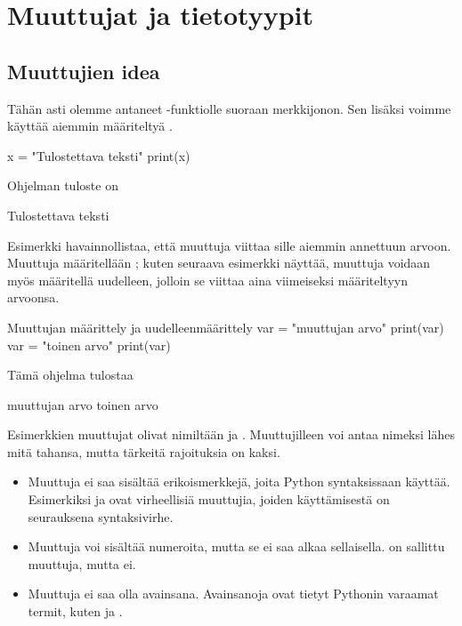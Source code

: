 \chapter{Muuttujat ja tietotyypit}

\section{Muuttujien idea}

Tähän asti olemme antaneet -funktiolle suoraan merkkijonon. Sen lisäksi voimme käyttää aiemmin määriteltyä .

\begin{python}
x = "Tulostettava teksti"
print(x)
\end{python}

Ohjelman tuloste on

\begin{output}
Tulostettava teksti
\end{output}

Esimerkki havainnollistaa, että muuttuja viittaa sille aiemmin annettuun arvoon. Muuttuja määritellään ; kuten seuraava esimerkki näyttää, muuttuja voidaan myös määritellä uudelleen, jolloin se viittaa aina viimeiseksi määriteltyyn arvoonsa.

\begin{example}{Muuttujan määrittely ja uudelleenmäärittely}
var = "muuttujan arvo"
print(var)
var = "toinen arvo"
print(var)
\end{example}

Tämä ohjelma tulostaa

\begin{output}
muuttujan arvo
toinen arvo
\end{output}

Esimerkkien muuttujat olivat nimiltään  ja . Muuttujilleen voi antaa nimeksi lähes mitä tahansa, mutta tärkeitä rajoituksia on kaksi.

\begin{itemize}
\item Muuttuja ei saa sisältää erikoismerkkejä, joita Python syntaksissaan käyttää. Esimerkiksi  ja  ovat virheellisiä muuttujia, joiden käyttämisestä on seurauksena syntaksivirhe.
\item Muuttuja voi sisältää numeroita, mutta se ei saa alkaa sellaisella.  on sallittu muuttuja, mutta  ei.
\item Muuttuja ei saa olla \gls{avainsana}. Avainsanoja ovat tietyt Pythonin varaamat termit, kuten  ja .
\end{itemize}

